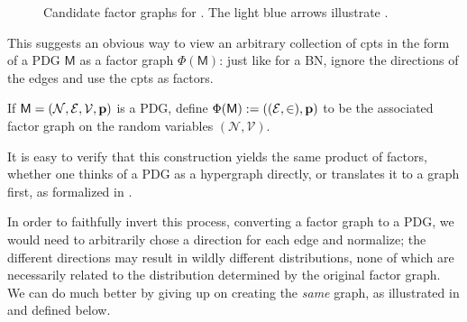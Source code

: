 \documentclass{article}
\newcommand{\V}{\mathcal V}
\newcommand{\N}{\mathcal N}
\newcommand{\Ed}{\mathcal E}
\newcommand{\sfM}{\mathsf M}
\numberwithin{equation}{section}
\begin{document}
\begin{figure}[htb]
\begin{subfigure}[b]{0.3\linewidth}
{}
			\caption{}\label{subfig:fg-smoking}
		\end{subfigure}%
		\caption{Candidate factor graphs for . The light blue arrows illustrate .}
		\label{fig:fg-intro-examples}
	\end{figure}
	
	This suggests an obvious way to view an arbitrary collection
        of cpts in the form of a PDG $\sfM$ as a factor graph
        $\Phi(\sfM)$: just like for a BN, ignore the directions of the
        edges and use the cpts as factors. 
	\begin{defn}
		If $\sfM = \mnvars[]$ is a PDG, define 
		$ \Phi(\sfM) := ((\Ed,\in), \mat p)$
		to be the associated factor graph on the random variables $(\N, \V)$.
	\end{defn}
	\begin{remark}
		It is easy to verify that this construction yields the
                same product of factors, whether one thinks of a PDG
                as a hypergraph directly, or translates it to a graph
                first, as formalized in . 
	\end{remark}

	In order to faithfully invert this process, converting a
        factor graph to a PDG, we would need to arbitrarily chose a
        direction for each edge and normalize; the different
        directions may result in wildly different distributions, none of
        which are necessarily related to the distribution determined
        by the original factor
        graph. We can do much better by giving up on creating
        the \emph{same} graph, as illustrated in  and
        defined below.  
	
\end{document}
